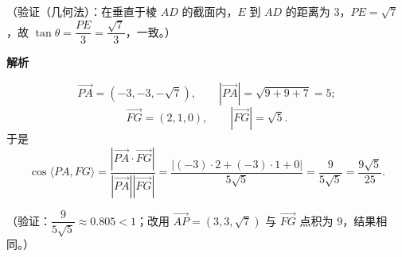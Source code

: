 \begin{answer}
（验证（几何法）：在垂直于棱 \(AD\) 的截面内，\(E\) 到 \(AD\) 的距离为 \(3\)，\(PE=\sqrt7\)，故 \(\tan\theta=\dfrac{PE}{3}=\dfrac{\sqrt7}{3}\)，一致。）


\textbf{解析}

\nopagebreak[4]
\[
\overrightarrow{PA}=(-3,-3,-\sqrt7),\qquad |\overrightarrow{PA}|=\sqrt{9+9+7}=5;
\]
\nopagebreak[4]
\[
\overrightarrow{FG}=(2,1,0),\qquad |\overrightarrow{FG}|=\sqrt5.
\]
于是
\nopagebreak[4]
\[
\cos\langle PA,FG\rangle
=\frac{|\overrightarrow{PA}\cdot\overrightarrow{FG}|}{|\overrightarrow{PA}||\overrightarrow{FG}|}
=\frac{|(-3)\cdot2+(-3)\cdot1+0|}{5\sqrt5}
=\frac{9}{5\sqrt5}=\frac{9\sqrt5}{25}.
\]

（验证：\(\dfrac{9}{5\sqrt5}\approx0.805<1\)；改用 \(\overrightarrow{AP}=(3,3,\sqrt7)\) 与 \(\overrightarrow{FG}\) 点积为 \(9\)，结果相同。）




\end{answer}
